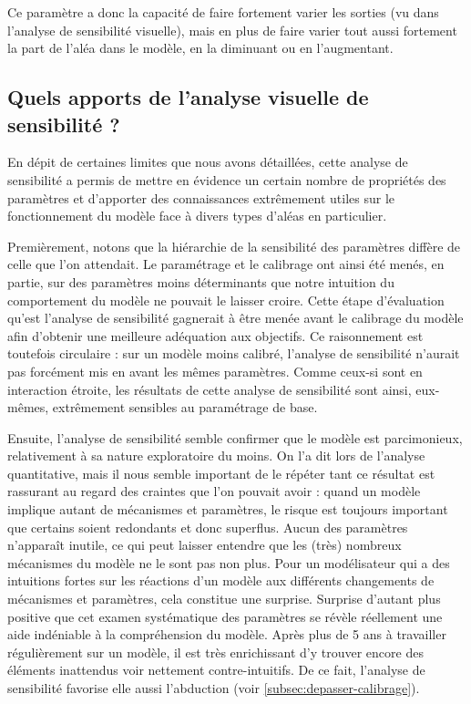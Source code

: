 Ce paramètre a donc la capacité de faire fortement varier les sorties (vu dans l'analyse de sensibilité visuelle), mais en plus de faire varier tout aussi fortement la part de l'aléa dans le modèle, en la diminuant ou en l'augmentant.

\subsection{Quels apports de l'analyse visuelle de sensibilité ?}

En dépit de certaines limites que nous avons détaillées, cette analyse de sensibilité a permis de mettre en évidence un certain nombre de propriétés des paramètres et d'apporter des connaissances extrêmement utiles sur le fonctionnement du modèle face à divers types d'aléas en particulier.

Premièrement, notons que la hiérarchie de la sensibilité des paramètres diffère de celle que l'on attendait.
Le paramétrage et le calibrage ont ainsi été menés, en partie, sur des paramètres moins déterminants que notre intuition du comportement du modèle ne pouvait le laisser croire.
Cette étape d'évaluation qu'est l'analyse de sensibilité gagnerait à être menée avant le calibrage du modèle afin d'obtenir une meilleure adéquation aux objectifs.
Ce raisonnement est toutefois circulaire : sur un modèle moins calibré, l'analyse de sensibilité n'aurait pas forcément mis en avant les mêmes paramètres.
Comme ceux-si sont en interaction étroite, les résultats de cette analyse de sensibilité sont ainsi, eux-mêmes, extrêmement sensibles au paramétrage de base.

Ensuite, l'analyse de sensibilité semble confirmer que le modèle est parcimonieux, relativement à sa nature exploratoire du moins.
On l'a dit lors de l'analyse quantitative, mais il nous semble important de le répéter tant ce résultat est rassurant au regard des craintes que l'on pouvait avoir : quand un modèle implique autant de mécanismes et paramètres, le risque est toujours important que certains soient redondants et donc superflus.
Aucun des paramètres n'apparaît inutile, ce qui peut laisser entendre que les (très) nombreux mécanismes du modèle ne le sont pas non plus.
Pour un modélisateur qui a des intuitions fortes sur les réactions d'un modèle aux différents changements de mécanismes et paramètres, cela constitue une surprise.
Surprise d'autant plus positive que cet examen systématique des paramètres se révèle réellement une aide indéniable à la compréhension du modèle.
Après plus de 5 ans à travailler régulièrement sur un modèle, il est très enrichissant d'y trouver encore des éléments inattendus voir nettement contre-intuitifs.
De ce fait, l'analyse de sensibilité favorise elle aussi l'abduction (voir \cref{subsec:depasser-calibrage}).

